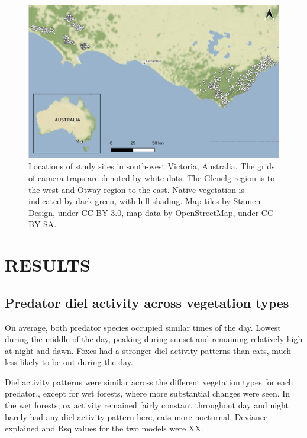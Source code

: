 \documentclass[]{elsarticle} %
\begin{document}
\newpage

\begin{figure}
\includegraphics[width=1\linewidth]{../figs/fig1_map} \caption{Locations of study sites in south-west Victoria, Australia. The grids of camera-traps are denoted by white dots. The Glenelg region is to the west and Otway region to the east. Native vegetation is indicated by dark green, with hill shading. Map tiles by Stamen Design, under CC BY 3.0, map data by OpenStreetMap, under CC BY SA.}\label{fig:map}
\end{figure}

\newpage

\hypertarget{results}{%
\section{RESULTS}\label{results}}

\hypertarget{predator-diel-activity-across-vegetation-types}{%
\subsection{Predator diel activity across vegetation types}\label{predator-diel-activity-across-vegetation-types}}

On average, both predator species occupied similar times of the day. Lowest during the middle of the day, peaking during sunset and remaining relatively high at night and dawn.
Foxes had a stronger diel activity patterns than cats, much less likely to be out during the day.

Diel activity patterns were similar across the different vegetation types for each predator,, except for wet forests, where more substantial changes were seen. In the wet forests, ox activity remained fairly constant throughout day and night barely had any diel activity pattern here, cats more nocturnal.
Deviance explained and Rsq values for the two models were XX.
\end{document}
